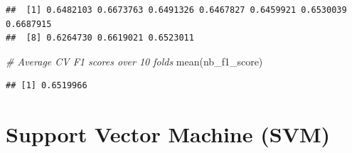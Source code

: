 \documentclass[
]{article}
\newenvironment{Shaded}{\begin{snugshade}}{\end{snugshade}}
\newcommand{\AttributeTok}[1]{\textcolor[rgb]{0.77,0.63,0.00}{#1}}
\newcommand{\CommentTok}[1]{\textcolor[rgb]{0.56,0.35,0.01}{\textit{#1}}}
\newcommand{\ConstantTok}[1]{\textcolor[rgb]{0.00,0.00,0.00}{#1}}
\newcommand{\FunctionTok}[1]{\textcolor[rgb]{0.00,0.00,0.00}{#1}}
\newcommand{\NormalTok}[1]{#1}
\newcommand{\OtherTok}[1]{\textcolor[rgb]{0.56,0.35,0.01}{#1}}
\newcommand{\SpecialCharTok}[1]{\textcolor[rgb]{0.00,0.00,0.00}{#1}}
\newcommand{\StringTok}[1]{\textcolor[rgb]{0.31,0.60,0.02}{#1}}
\begin{document}
\begin{verbatim}
##  [1] 0.6482103 0.6673763 0.6491326 0.6467827 0.6459921 0.6530039 0.6687915
##  [8] 0.6264730 0.6619021 0.6523011
\end{verbatim}

\begin{Shaded}
\begin{Highlighting}[]
\CommentTok{\# Average CV F1 scores over 10 folds}
\FunctionTok{mean}\NormalTok{(nb\_f1\_score)}
\end{Highlighting}
\end{Shaded}

\begin{verbatim}
## [1] 0.6519966
\end{verbatim}

\begin{Shaded}
\end{Shaded}

\hypertarget{support-vector-machine-svm}{%
\section{Support Vector Machine
(SVM)}\label{support-vector-machine-svm}}
\end{document}
